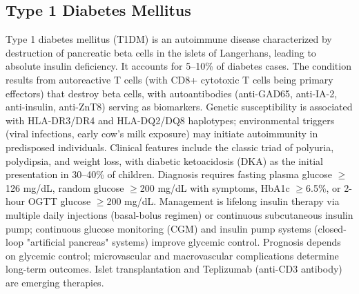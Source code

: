 \subsection{Type 1 Diabetes Mellitus}
\label{sec:Type 1 Diabetes Mellitus}
Type 1 diabetes mellitus (T1DM) is an autoimmune disease characterized by destruction of pancreatic beta cells in the islets of Langerhans, leading to absolute insulin deficiency. It accounts for 5--10\% of diabetes cases. The condition results from autoreactive T cells (with CD8+ cytotoxic T cells being primary effectors) that destroy beta cells, with autoantibodies (anti-GAD65, anti-IA-2, anti-insulin, anti-ZnT8) serving as biomarkers. Genetic susceptibility is associated with HLA-DR3/DR4 and HLA-DQ2/DQ8 haplotypes; environmental triggers (viral infections, early cow's milk exposure) may initiate autoimmunity in predisposed individuals. Clinical features include the classic triad of polyuria, polydipsia, and weight loss, with diabetic ketoacidosis (DKA) as the initial presentation in 30--40\% of children. Diagnosis requires fasting plasma glucose $\geq$126 mg/dL, random glucose $\geq$200 mg/dL with symptoms, HbA1c $\geq$6.5\%, or 2-hour OGTT glucose $\geq$200 mg/dL. Management is lifelong insulin therapy via multiple daily injections (basal-bolus regimen) or continuous subcutaneous insulin pump; continuous glucose monitoring (CGM) and insulin pump systems (closed-loop "artificial pancreas" systems) improve glycemic control. Prognosis depends on glycemic control; microvascular and macrovascular complications determine long-term outcomes. Islet transplantation and Teplizumab (anti-CD3 antibody) are emerging therapies.

